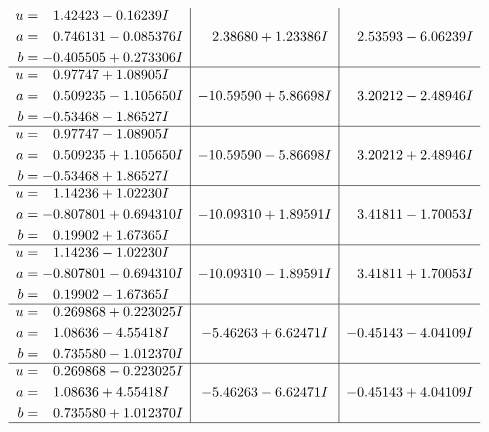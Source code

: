 \documentclass[1p]{elsarticle_modified}
\theoremstyle{definition}
\begin{document}
$$\begin{array}{c|c|c}
\begin{aligned}
u &= \phantom{-}1.42423 - 0.16239 I \\
a &= \phantom{-}0.746131 - 0.085376 I \\
b &= -0.405505 + 0.273306 I\end{aligned}
 & \phantom{-}2.38680 + 1.23386 I & \phantom{-}2.53593 - 6.06239 I \\ \hline\begin{aligned}
u &= \phantom{-}0.97747 + 1.08905 I \\
a &= \phantom{-}0.509235 - 1.105650 I \\
b &= -0.53468 - 1.86527 I\end{aligned}
 & -10.59590 + 5.86698 I & \phantom{-}3.20212 - 2.48946 I \\ \hline\begin{aligned}
u &= \phantom{-}0.97747 - 1.08905 I \\
a &= \phantom{-}0.509235 + 1.105650 I \\
b &= -0.53468 + 1.86527 I\end{aligned}
 & -10.59590 - 5.86698 I & \phantom{-}3.20212 + 2.48946 I \\ \hline\begin{aligned}
u &= \phantom{-}1.14236 + 1.02230 I \\
a &= -0.807801 + 0.694310 I \\
b &= \phantom{-}0.19902 + 1.67365 I\end{aligned}
 & -10.09310 + 1.89591 I & \phantom{-}3.41811 - 1.70053 I \\ \hline\begin{aligned}
u &= \phantom{-}1.14236 - 1.02230 I \\
a &= -0.807801 - 0.694310 I \\
b &= \phantom{-}0.19902 - 1.67365 I\end{aligned}
 & -10.09310 - 1.89591 I & \phantom{-}3.41811 + 1.70053 I \\ \hline\begin{aligned}
u &= \phantom{-}0.269868 + 0.223025 I \\
a &= \phantom{-}1.08636 - 4.55418 I \\
b &= \phantom{-}0.735580 - 1.012370 I\end{aligned}
 & -5.46263 + 6.62471 I & -0.45143 - 4.04109 I \\ \hline\begin{aligned}
u &= \phantom{-}0.269868 - 0.223025 I \\
a &= \phantom{-}1.08636 + 4.55418 I \\
b &= \phantom{-}0.735580 + 1.012370 I\end{aligned}
 & -5.46263 - 6.62471 I & -0.45143 + 4.04109 I\\
 \hline 
 \end{array}$$\newpage\newpage\renewcommand{\arraystretch}{1}
\end{document}
